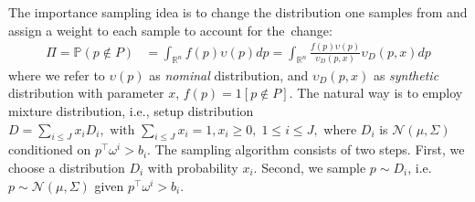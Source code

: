 The importance sampling idea is to change the distribution one samples from and assign a weight to each sample to account for the~change: 
\begin{align*}
    \Pi  = \mathbb{P}(p\not\in P) & = \int_{\mathbb{R}^n} f(p) \upsilon(p) dp = \!\int_{\mathbb{R}^n}\!\! \frac{f(p)\upsilon(p)}{\upsilon_D(p,x)}\upsilon_D(p,x) dp%
\end{align*}
where we refer to $\upsilon(p)$ as \emph{nominal} distribution, and $\upsilon_D(p,x)$ as \emph{synthetic} distribution with parameter $x$,  $f(p) = 1[p\not\in P]$. The natural way is to employ mixture distribution, i.e., setup distribution $D = \sum_{i \le J} x_i D_i, \text{ with } \sum_{i\le J} x_i = 1, x_i \ge 0, \; 1\le i \le J,$ where $D_i$ is $\mathcal{N}(\mu,\Sigma)$ conditioned on $p^\top\omega^i > \!b_i$. The sampling algorithm consists of two steps. First, we choose a distribution $D_i$ with probability $x_i$. Second, we sample $p \sim D_i$, i.e. $p\sim \mathcal{N}(\mu,\Sigma)$ given $p^\top\omega^i>b_i$. 


